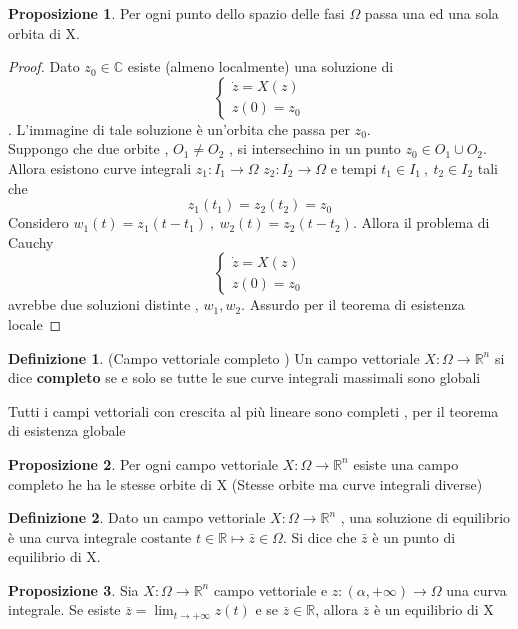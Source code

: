 \documentclass{article}
\theoremstyle{definition}
\newtheorem{definizione}{Definizione}[section]
\newtheorem*{proposizione}{Proposizione}
\newcommand{\R}{\mathbb{R}}
\newcommand{\Rn}{\R^n}
\begin{document}
\begin{proposizione}
	Per ogni punto dello spazio delle fasi $\Omega$ passa una ed una sola orbita di X. 
\end{proposizione}
\begin{proof}
	Dato $z_0\in \mathbb{C}$ esiste (almeno localmente) una soluzione di 
	$$\begin{cases}
		\dot{z}=X(z)\\
		z(0)=z_0
	\end{cases}$$. L'immagine di tale soluzione è un'orbita che passa per $z_0$.\\
	Suppongo che due orbite , $O_1\neq O_2$ , si intersechino in un punto $z_0 \in O_1\cup O_2$. Allora esistono curve integrali $z_1:I_1 \rightarrow \Omega $ $z_2:I_2 \rightarrow \Omega $ e tempi $t_1 \in I_1 \ , \ t_2 \in I_2$ tali che 
	$$z_1(t_1)=z_2(t_2)=z_0$$
	Considero $w_1(t)=z_1(t-t_1) \ , \  w_2(t)=z_2(t-t_2)$. Allora il problema di Cauchy 
	$$\begin{cases}
		\dot{z}=X(z)\\
		z(0)=z_0
			\end{cases}$$ avrebbe due soluzioni distinte , $w_1,w_2$. Assurdo per il teorema di esistenza locale 
\end{proof}
\begin{definizione}(Campo vettoriale completo )
	Un campo vettoriale $X:\Omega \rightarrow \Rn$ si dice \textbf{completo} se e solo se tutte le sue curve integrali massimali sono globali 
\end{definizione}
Tutti i campi vettoriali con crescita al più lineare sono completi , per il teorema di esistenza globale
\begin{proposizione}
	Per ogni campo vettoriale $X:\Omega \rightarrow \Rn$ esiste una campo completo he ha le stesse orbite di X (Stesse orbite ma curve integrali diverse)
\end{proposizione}
\begin{definizione}
	Dato un campo vettoriale $X:\Omega \rightarrow \Rn$ , una soluzione di equilibrio è una curva integrale costante $t \in \R \mapsto \bar{z} \in \Omega $. Si dice che $\bar{z}$ è un punto di equilibrio di X.  
\end{definizione}
\begin{proposizione}
	Sia $X:\Omega \rightarrow \Rn$ campo vettoriale e $z:(\alpha , +\infty)\rightarrow \Omega$ una curva integrale. Se esiste $\overline{z}=\lim_{t\rightarrow +\infty} z(t) $ e se $\overline{z}\in \R$, allora $\overline{z}$ è un equilibrio di X 
\end{proposizione}
\end{document}
